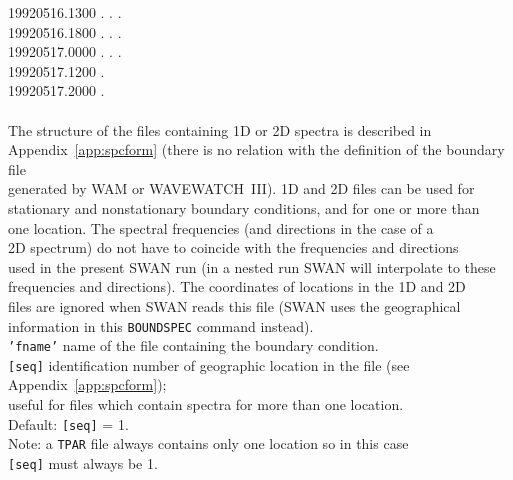 \documentclass[12pt]{book}
\begin{document}
\begin{tabbing}
                           19920516.1300     .  .  .\\
                           19920516.1800     .  .  .\\
                           19920517.0000     .   .  .\\
                           19920517.1200       .   \\
                           19920517.2000       .   \\
                                           \>          \>          \>           \>       \\
                        \poptabs
                        The structure of the files containing 1D or 2D spectra is described in\\
                        Appendix~\ref{app:spcform} (there is no relation with the definition of the boundary file\\
                        generated by WAM or WAVEWATCH~III). 1D and 2D files can be used for\\
                        stationary and nonstationary boundary conditions, and for one or more than\\
                        one location. The spectral frequencies (and directions in the case of a\\
                        2D spectrum) do not have to coincide with the frequencies and directions\\
                        used in the present SWAN run (in a nested run SWAN will interpolate to these\\
                        frequencies and directions). The coordinates of locations in the 1D and 2D\\
                        files are ignored when SWAN reads this file (SWAN uses the geographical\\
                        information in this {\tt BOUNDSPEC} command instead).\-\\
{\tt {'fname'}}      \> name of the file containing the boundary condition.\\
{\tt [seq]}          \> identification number of geographic location in the file (see Appendix~\ref{app:spcform});\+\\
                        useful for files which contain spectra for more than one location.\\
                        Default: {\tt [seq]} = 1.\\
                        Note: a {\tt TPAR} file always contains only one location so in this case\\
                        {\tt [seq]} must always be 1.\-\\
\end{tabbing}
\end{document}

